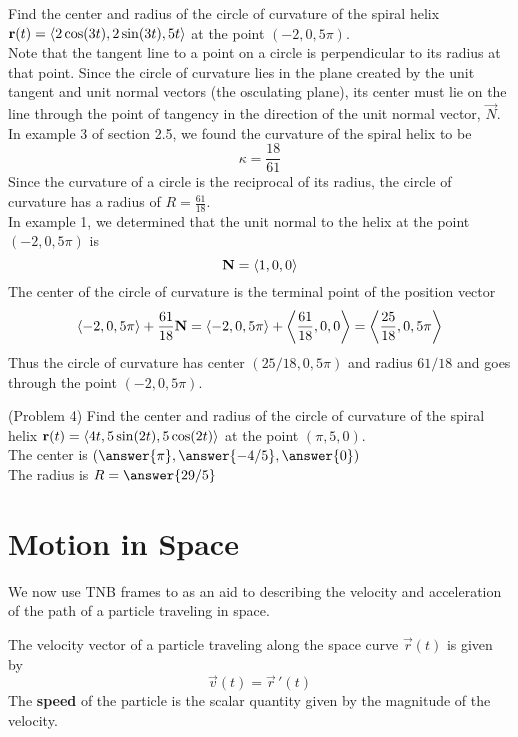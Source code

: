 \documentclass[handout]{ximera}
\begin{document}
\begin{example}[Example 4]
Find the center and radius of the circle of curvature of the spiral helix $\mathbf r(t) =  \left\langle 2\cos(3t), 2\sin(3t), 5t\right\rangle$ at the point $(-2, 0, 5\pi)$.\\

Note that the tangent line to a point on a circle is perpendicular to its radius at that point. 
Since the circle of curvature lies in the plane created by the unit tangent and unit normal vectors (the osculating plane),
its center must lie on the line through the point of tangency in the direction of the unit normal vector, $\vec N$.\\

In example 3 of section 2.5, we found the curvature of the spiral helix to be 
\[
\kappa = \frac{18}{61}
\]
Since the curvature of a circle is the reciprocal of its radius, the circle of curvature has a radius of $R = \frac{61}{18}$.\\

In example 1, we determined that the unit normal to the helix at the point $(-2, 0, 5\pi)$ is
\[
\mathbf N = \left\langle 1, 0, 0\right\rangle
\]
The center of the circle of curvature is the terminal point of the position vector 
\[
\left\langle -2, 0, 5\pi\right\rangle + \frac{61}{18}\mathbf N = \left\langle -2, 0, 5\pi\right\rangle + \left\langle \frac{61}{18}, 0, 0\right\rangle = \left\langle \frac{25}{18} , 0, 5\pi\right\rangle
\]
Thus the circle of curvature has center $(25/18, 0, 5\pi)$ and radius $61/18$ and goes through the point $(-2, 0, 5\pi)$.
\end{example}

\begin{problem}(Problem 4)
Find the center and radius of the circle of curvature of the spiral helix $\mathbf r(t) = \left\langle 4t, 5 \sin(2t),5\cos(2t)\right\rangle$ at the point $(\pi, 5, 0)$.\\

The center is $\left(\answer{\pi}, \answer{-4/5}, \answer{0}\right)$\\
The radius is $R = \answer{29/5}$
\end{problem}


\section{Motion in Space}

We now use TNB frames to as an aid to describing the velocity and acceleration of the path of a particle traveling in space.

\begin{definition}[Velocity]
The velocity vector of a particle traveling along the space curve $\vec r(t)$ is given by
\[
\vec v(t) = \vec r\,'(t)
\]
The \textbf{speed} of the particle is the scalar quantity given by the magnitude of the velocity.
\end{definition}
\end{document}
